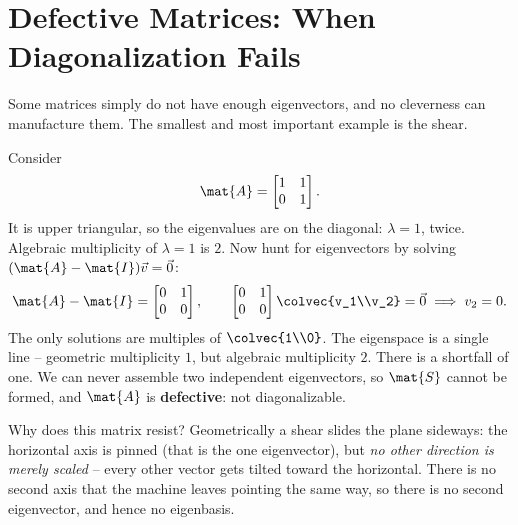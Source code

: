\section{Defective Matrices: When Diagonalization Fails}
\label{ch24:defective}

Some matrices simply do not have enough eigenvectors, and no cleverness can
manufacture them. The smallest and most important example is the shear.

\begin{example}
\label{ch24:shear}
Consider
\[
  \mat{A} = \begin{bmatrix} 1 & 1 \\ 0 & 1 \end{bmatrix}.
\]
It is upper triangular, so the eigenvalues are on the diagonal: $\lambda = 1$,
twice. Algebraic multiplicity of $\lambda=1$ is $2$. Now hunt for eigenvectors by
solving $(\mat{A}-\mat{I})\vec{v} = \vec0$:
\[
  \mat{A} - \mat{I} = \begin{bmatrix} 0 & 1 \\ 0 & 0 \end{bmatrix},
  \qquad
  \begin{bmatrix} 0 & 1 \\ 0 & 0 \end{bmatrix}\colvec{v_1\\v_2} = \vec0
  \;\Longrightarrow\; v_2 = 0.
\]
The only solutions are multiples of $\colvec{1\\0}$. The eigenspace is a single
line -- geometric multiplicity $1$, but algebraic multiplicity $2$. There is a
shortfall of one. We can never assemble two independent eigenvectors, so
$\mat{S}$ cannot be formed, and $\mat{A}$ is \textbf{defective}: not
diagonalizable.
\end{example}

Why does this matrix resist? Geometrically a shear slides the plane sideways: the
horizontal axis is pinned (that is the one eigenvector), but \emph{no other
direction is merely scaled} -- every other vector gets tilted toward the
horizontal. There is no second axis that the machine leaves pointing the same
way, so there is no second eigenvector, and hence no eigenbasis.


